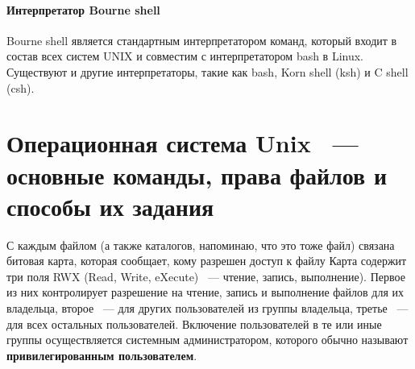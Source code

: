\documentclass[10pt]{article}
\begin{document}
	\paragraph{Интерпретатор Bourne shell} Bourne shell является стандартным интерпретатором команд, который входит в состав всех систем UNIX и совместим с интерпретатором bash в Linux. Существуют и другие интерпретаторы, такие как bash, Korn shell (ksh) и C shell (csh).

	\section{Операционная система Unix ~--- основные команды, права файлов и способы их задания}
	С каждым файлом (а также каталогов, напоминаю, что это тоже файл) связана битовая карта, которая сообщает, кому разрешен доступ к файлу Карта содержит три поля RWX (Read, Write, eXecute) ~--- чтение, запись, выполнение). Первое из них контролирует разрешение на чтение, запись и выполнение файлов для их владельца, второе ~--- для других пользователей из группы владельца, третье ~--- для всех остальных пользователей. Включение пользователей в те или иные группы осуществляется системным администратором, которого обычно называют \textbf{привилегированным пользователем}.
\end{document}
